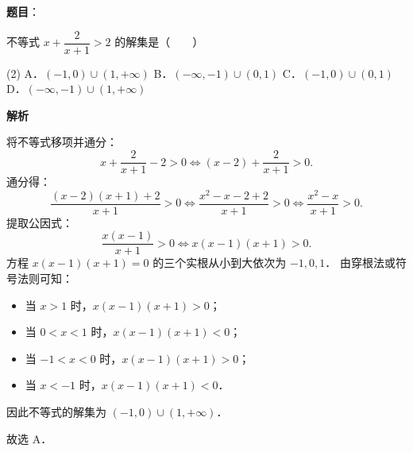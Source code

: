 \begin{answer}

\textbf{题目}：

不等式 $x + \dfrac{2}{x + 1} > 2$ 的解集是\mbox{（　　）}

\begin{gkopts}(2)
\task A．$(-1, 0) \cup (1, +\infty)$
\task B．$(-\infty, -1) \cup (0, 1)$
\task C．$(-1, 0) \cup (0, 1)$
\task D．$(-\infty, -1) \cup (1, +\infty)$
\end{gkopts}

\textbf{解析}

将不等式移项并通分：
\nopagebreak[4]
\[
x + \frac{2}{x + 1} - 2 > 0 \iff (x - 2) + \frac{2}{x + 1} > 0.
\]
通分得：
\nopagebreak[4]
\[
\frac{(x - 2)(x + 1) + 2}{x + 1} > 0 \iff \frac{x^2 - x - 2 + 2}{x + 1} > 0 \iff \frac{x^2 - x}{x + 1} > 0.
\]
提取公因式：
\nopagebreak[4]
\[
\frac{x(x - 1)}{x + 1} > 0 \iff x(x - 1)(x + 1) > 0.
\]
方程 $x(x - 1)(x + 1) = 0$ 的三个实根从小到大依次为 $-1, 0, 1$．
由穿根法或符号法则可知：
\begin{itemize}
\item 当 $x > 1$ 时，$x(x - 1)(x + 1) > 0$；
\item 当 $0 < x < 1$ 时，$x(x - 1)(x + 1) < 0$；
\item 当 $-1 < x < 0$ 时，$x(x - 1)(x + 1) > 0$；
\item 当 $x < -1$ 时，$x(x - 1)(x + 1) < 0$．
\end{itemize}

因此不等式的解集为 $(-1, 0) \cup (1, +\infty)$．

故选 A．


\end{answer}
